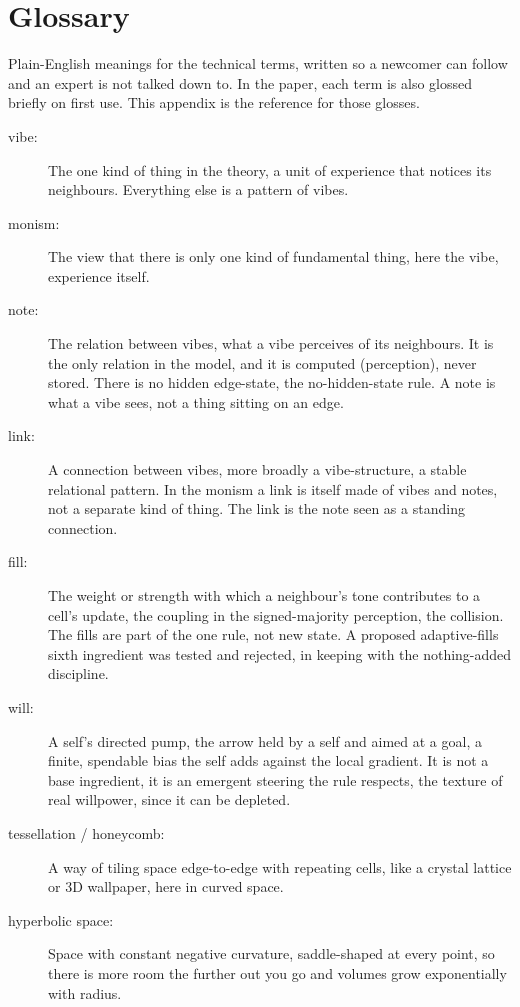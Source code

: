 \section{Glossary}

Plain-English meanings for the technical terms, written so a newcomer can follow and an expert is not talked down
to. In the paper, each term is also glossed briefly on first use. This appendix is the reference for those
glosses.

\begin{description}
  \item[vibe:] The one kind of thing in the theory, a unit of experience that notices its neighbours. Everything
  else is a pattern of vibes.
  \item[monism:] The view that there is only one kind of fundamental thing, here the vibe, experience itself.
  \item[note:] The relation between vibes, what a vibe perceives of its neighbours. It is the only relation in the
  model, and it is computed (perception), never stored. There is no hidden edge-state, the no-hidden-state rule. A
  note is what a vibe sees, not a thing sitting on an edge.
  \item[link:] A connection between vibes, more broadly a vibe-structure, a stable relational pattern. In the
  monism a link is itself made of vibes and notes, not a separate kind of thing. The link is the note seen as a
  standing connection.
  \item[fill:] The weight or strength with which a neighbour's tone contributes to a cell's update, the coupling in
  the signed-majority perception, the collision. The fills are part of the one rule, not new state. A proposed
  adaptive-fills sixth ingredient was tested and rejected, in keeping with the nothing-added discipline.
  \item[will:] A self's directed pump, the arrow held by a self and aimed at a goal, a finite, spendable bias the
  self adds against the local gradient. It is not a base ingredient, it is an emergent steering the rule respects,
  the texture of real willpower, since it can be depleted.
  \item[tessellation / honeycomb:] A way of tiling space edge-to-edge with repeating cells, like a crystal lattice
  or 3D wallpaper, here in curved space.
  \item[hyperbolic space:] Space with constant negative curvature, saddle-shaped at every point, so there is more
  room the further out you go and volumes grow exponentially with radius.

\end{description}
